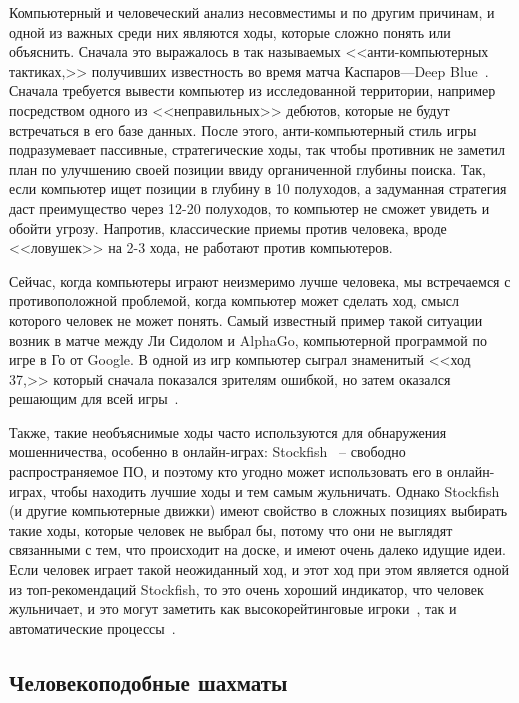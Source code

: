 \documentclass{article}
\begin{document}
Компьютерный и человеческий анализ несовместимы и по другим причинам,
и одной из важных среди них являются ходы, которые сложно понять или объяснить.
Сначала это выражалось в так называемых <<анти-компьютерных тактиках,>>
получивших известность во время матча Каспаров---Deep Blue~\cite{kasparov-anti-computer-chess}.
Сначала требуется вывести компьютер из исследованной территории,
например посредством одного из <<неправильных>> дебютов,
которые не будут встречаться в его базе данных.
После этого, анти-компьютерный стиль игры подразумевает пассивные, стратегические ходы,
так чтобы противник не заметил план по улучшению своей позиции ввиду органиченной глубины поиска.
Так, если компьютер ищет позиции в глубину в 10 полуходов, а задуманная стратегия даст преимущество через
12-20 полуходов, то компьютер не сможет увидеть и обойти угрозу.
Напротив, классические приемы против человека, вроде <<ловушек>> на 2-3 хода,
не работают против компьютеров.

Сейчас, когда компьютеры играют неизмеримо лучше человека,
мы встречаемся с противоположной проблемой,
когда компьютер может сделать ход,
смысл которого человек не может понять.
Самый известный пример такой ситуации возник в матче между Ли Сидолом и AlphaGo,
компьютерной программой по игре в Го от Google.
В одной из игр компьютер сыграл знаменитый <<ход 37,>>
который сначала показался зрителям ошибкой,
но затем оказался решающим для всей игры~\cite{wired-alphago}.

Также, такие необъяснимые ходы часто используются для обнаружения
мошенничества, особенно в онлайн-играх:
Stockfish~\cite{stockfish} -- свободно распространяемое ПО,
и поэтому кто угодно может использовать его в онлайн-играх,
чтобы находить лучшие ходы и тем самым жульничать.
Однако Stockfish (и другие компьютерные движки)
имеют свойство в сложных позициях выбирать такие ходы, которые человек не выбрал бы,
потому что они не выглядят связанными с тем, что происходит на доске,
и имеют очень далеко идущие идеи.
Если человек играет такой неожиданный ход, и этот ход при этом
является одной из топ-рекомендаций Stockfish,
то это очень хороший индикатор, что человек жульничает,
и это могут заметить как высокорейтинговые игроки~\cite{gothamchess-cheater-exposed},
так и автоматические процессы~\cite{lichess-kaladin}.

\subsection{Человекоподобные шахматы}
\end{document}
